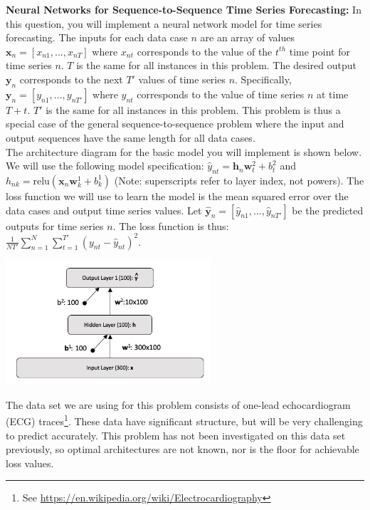 \documentclass[11pt]{article}
\newcommand{\mbf}[1]{{\mathbf{#1}}}
\begin{document}
\begin{problem}{20} \textbf{Neural Networks for Sequence-to-Sequence Time Series Forecasting:} In this question, you will implement a neural network model for time series forecasting. The inputs for each data case $n$ are an array of values $\mbf{x}_n=[x_{n1},...,x_{nT}]$ where $x_{nt}$ corresponds to the value of the $t^{th}$ time point for time series $n$. $T$ is the same for all instances in this problem. The desired output $\mbf{y}_n$ corresponds to the next $T'$ values of time series $n$. Specifically, $\mbf{y}_n=[y_{n1},...,y_{nT'}]$ where $y_{nt}$ corresponds to the value of time series $n$ at time $T+t$. $T'$ is the same for all instances in this problem. This problem is thus a special case of the general sequence-to-sequence problem where the input and output sequences have the same length for all data cases.\\

The architecture diagram for the basic model you will implement is shown below. We will use the 
following model specification:
$\hat{y}_{nt} = \mbf{h}_{n} \mbf{w}^2_{t} + b^2_{t}$ and $h_{nk} = \mbox{relu}(\mbf{x}_n  
\mbf{w}^1_{k} + b^1_k)$ (Note: superscripts refer to layer index, not powers). The loss function we will use to learn the model is the mean squared 
error over the data cases and output time series values. Let 
$\hat{\mbf{y}}_n=[\hat{{y}}_{n1},...,\hat{{y}}_{nT'}]$ be the predicted outputs for time series 
$n$. The loss function is thus: $\frac{1}{NT'}\sum_{n=1}^N\sum_{t=1}^{T'} (y_{nt}-\hat{y}_{nt})^2$.

\begin{center}
\includegraphics[width=3in]{figure1.png}
\end{center}

The data set we are using for this problem consists of one-lead echocardiogram (ECG) traces\footnote{See \url{https://en.wikipedia.org/wiki/Electrocardiography}}. These data have significant structure, but will be very challenging to predict accurately. This problem has not been investigated on this data set previously, so optimal architectures are not known, nor is the floor for achievable loss values. \\


\end{problem}
\end{document}
